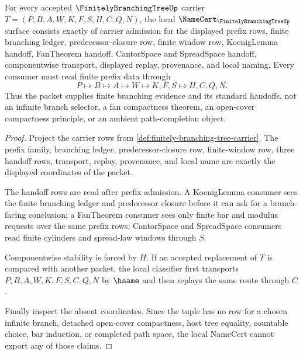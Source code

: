 \begin{theorem}
\label{thm:finitely-branching-tree-namecert-obligations}
For every accepted $\FinitelyBranchingTreeUp$ carrier $T=(P,B,A,W,K,F,S,H,C,Q,N)$, the local $\NameCert_{\FinitelyBranchingTreeUp}$ surface consists exactly of carrier admission for the displayed prefix rows, finite branching ledger, predecessor-closure row, finite window row, KoenigLemma handoff, FanTheorem handoff, CantorSpace and SpreadSpace handoff, componentwise transport, displayed replay, provenance, and local naming. Every consumer must read finite prefix data through
$$
P\longmapsto B\longmapsto A\longmapsto W\longmapsto K,F,S\longmapsto H,C,Q,N .
$$
Thus the packet supplies finite branching evidence and its standard handoffs, not an infinite branch selector, a fan compactness theorem, an open-cover compactness principle, or an ambient path-completion object.
\end{theorem}
\begin{proof}
Project the carrier rows from \autoref{def:finitely-branching-tree-carrier}. The prefix family, branching ledger, predecessor-closure row, finite-window row, three handoff rows, transport, replay, provenance, and local name are exactly the displayed coordinates of the packet.

The handoff rows are read after prefix admission. A KoenigLemma consumer sees the finite branching ledger and predecessor closure before it can ask for a branch-facing conclusion; a FanTheorem consumer sees only finite bar and modulus requests over the same prefix rows; CantorSpace and SpreadSpace consumers read finite cylinders and spread-law windows through $S$.

Componentwise stability is forced by $H$. If an accepted replacement of $T$ is compared with another packet, the local classifier first transports $P,B,A,W,K,F,S,C,Q,N$ by $\hsame$ and then replays the same route through $C$.

Finally inspect the absent coordinates. Since the tuple has no row for a chosen infinite branch, detached open-cover compactness, host tree equality, countable choice, bar induction, or completed path space, the local NameCert cannot export any of those claims.
\end{proof}

